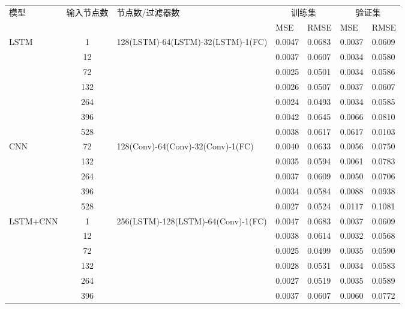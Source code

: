 \begin{table}[!htbp]
    \label{tab:sunspot_number_input_month}
    \centering
    \footnotesize
    \setlength{\tabcolsep}{5.8pt}
    \renewcommand{\arraystretch}{1}
    \begin{tabular}{lclllll}
        \toprule
         \multirow{2}{*}{模型} & \multirow{2}{*}{输入节点数} & \multirow{2}{*}{节点数/过滤器数} & \multicolumn{2}{c}{训练集} & \multicolumn{2}{c}{验证集}\\
        \cmidrule(lr){4-5}\cmidrule(lr){6-7} \noalign{\smallskip}
         & & & MSE & RMSE & MSE & RMSE\\
        \midrule
        LSTM & 1 & 128(LSTM)-64(LSTM)-32(LSTM)-1(FC) & 0.0047 & 0.0683 & 0.0037 & 0.0609 \\
        & 12 & & 0.0037 & 0.0607 & 0.0034 & 0.0580 \\
        & 72 & & 0.0025 & 0.0501 & 0.0034 & 0.0586 \\
        & 132 & & 0.0026 & 0.0507 & 0.0037 & 0.0607 \\
        & 264 & & 0.0024 & 0.0493 & 0.0034 & 0.0585 \\
        & 396 & & 0.0042 & 0.0645 & 0.0066 & 0.0810 \\
        & 528 & & 0.0038 & 0.0617 & 0.0617 & 0.0103 \\
        \hline
        CNN & 72 & 128(Conv)-64(Conv)-32(Conv)-1(FC) & 0.0040 & 0.0633 & 0.0056 & 0.0750 \\
        & 132 & & 0.0035 & 0.0594 & 0.0061 & 0.0783 \\
        & 264 & & 0.0037 & 0.0609 & 0.0050 & 0.0706 \\
        & 396 & & 0.0034 & 0.0584 & 0.0088 & 0.0938 \\
        & 528 & & 0.0027 & 0.0524 & 0.0117 & 0.1081 \\
        \hline
        LSTM+CNN & 1 & 256(LSTM)-128(LSTM)-64(Conv)-1(FC) & 0.0047 & 0.0683 & 0.0037 & 0.0609 \\
        & 12 & & 0.0038 & 0.0614 & 0.0032 & 0.0568 \\
        & 72 & & 0.0025 & 0.0499 & 0.0035 & 0.0590 \\
        & 132 & & 0.0028 & 0.0531 & 0.0034 & 0.0583 \\
        & 264 & & 0.0027 & 0.0519 & 0.0035 & 0.0589 \\
        & 396 & & 0.0037 & 0.0607 & 0.0060 & 0.0772 \\

\end{tabular}
\end{table}
